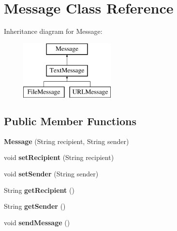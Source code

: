 \hypertarget{class_message}{}\section{Message Class Reference}
\label{class_message}
Inheritance diagram for Message\+:\begin{figure}[H]
\begin{center}
\leavevmode
\includegraphics[height=3.000000cm]{class_message}
\end{center}
\end{figure}
\subsection*{Public Member Functions}
\begin{DoxyCompactItemize}
\item 
\mbox{\label{class_message_a7c336ac492169c70df799ffdfaf02f2e}} 
{\bfseries Message} (String recipient, String sender)
\item 
\mbox{\label{class_message_aa434db00d360b66f170302eb5e650731}} 
void {\bfseries set\+Recipient} (String recipient)
\item 
\mbox{\label{class_message_ab07abfbf9a9533506caa21a445021064}} 
void {\bfseries set\+Sender} (String sender)
\item 
\mbox{\label{class_message_a18cbe1109db77983103d6f6b84c7e0f2}} 
String {\bfseries get\+Recipient} ()
\item 
\mbox{\label{class_message_aa367758d3a7dc4977fe09cd17dffa36a}} 
String {\bfseries get\+Sender} ()
\item 
\mbox{\label{class_message_aad82a5b5042d3ac413769baa1d662846}} 
void {\bfseries send\+Message} ()
\end{DoxyCompactItemize}
